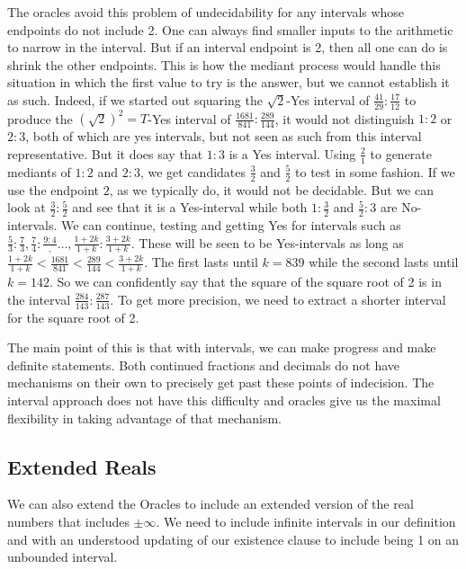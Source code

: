 \documentclass[12pt]{article}
\theoremstyle{remark}
\begin{document}
The oracles avoid this problem of undecidability for any intervals whose endpoints do not include 2. One can always find smaller inputs to the arithmetic to narrow in the interval. But if an interval endpoint is 2, then all one can do is shrink the other endpoints. This is how the mediant process would handle this situation in which the first value to try is the answer, but we cannot establish it as such. Indeed, if we started out squaring the $\sqrt{2}$-Yes interval of $\frac{41}{29}:\frac{17}{12}$ to produce the $(\sqrt{2})^2=T$-Yes interval of $\frac{1681}{841}:\frac{289}{144}$, it would not distinguish $1:2$ or $2:3$, both of which are yes intervals, but not seen as such from this interval representative. But it does say that $1:3$ is a Yes interval. Using $\frac{2}{1}$ to generate mediants of $1:2$ and $2:3$, we get candidates $\frac{3}{2}$ and $\frac{5}{2}$ to test in some fashion. If we use the endpoint $2$, as we typically do, it would not be decidable. But we can look at $\frac{3}{2}:\frac{5}{2}$ and see that it is a Yes-interval while both $1:\frac{3}{2}$ and $\frac{5}{2}:3$ are No-intervals. We can continue, testing and getting Yes for intervals such as $\frac{5}{3}:\frac{7}{3}, \frac{7}{4}:\frac{9:4}, \ldots, \frac{1 + 2k}{1+k}:\frac{3+2k}{1+k}$. These will be seen to be Yes-intervals as long as $\frac{1+2k}{1+k} < \frac{1681}{841} < \frac{289}{144} < \frac{3+2k}{1+k}$. The first lasts until $k=839$ while the second lasts until $k=142$. So we can confidently say that the square of the square root of 2 is in the interval $\frac{284}{143}:\frac{287}{143}$. To get more precision, we need to extract a shorter interval for the square root of 2. 

The main point of this is that with intervals, we can make progress and make definite statements. Both continued fractions and decimals do not have mechanisms on their own to precisely get past these points of indecision. The interval approach does not have this difficulty and oracles give us the maximal flexibility in taking advantage of that mechanism.


\subsection{Extended Reals}

We can also extend the Oracles to include an extended version of the real numbers that includes $\pm \infty$. We need to include infinite intervals in our definition and with an understood updating of our existence clause to include being 1 on an unbounded interval.
\end{document}

